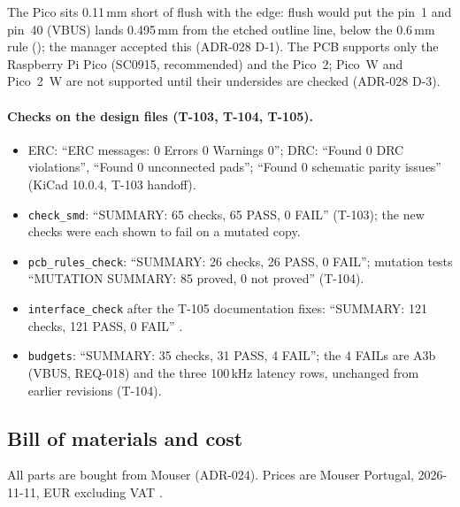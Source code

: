 The Pico sits 0.11\,mm short of flush with the edge: flush would put the pin~1 and
pin~40 (VBUS) lands 0.495\,mm from the etched outline line, below the 0.6\,mm rule
(); the manager accepted this (ADR-028 D-1). The PCB supports
only the Raspberry Pi Pico (SC0915, recommended) and the Pico~2; Pico~W and Pico~2~W
are not supported until their undersides are checked (ADR-028 D-3).

\paragraph{Checks on the design files (T-103, T-104, T-105).}
\begin{itemize}[noitemsep]
  \item ERC: ``ERC messages: 0  Errors 0  Warnings 0''; DRC: ``Found 0 DRC
        violations'', ``Found 0 unconnected pads''; ``Found 0 schematic parity
        issues'' (KiCad 10.0.4, T-103 handoff).
  \item \nolinkurl{check_smd}: ``SUMMARY: 65 checks, 65 PASS, 0 FAIL'' (T-103); the
        new checks were each shown to fail on a mutated copy.
  \item \nolinkurl{pcb_rules_check}: ``SUMMARY: 26 checks, 26 PASS, 0 FAIL''; mutation
        tests ``MUTATION SUMMARY: 85 proved, 0 not proved'' (T-104).
  \item \nolinkurl{interface_check} after the T-105 documentation fixes:
        ``SUMMARY: 121 checks, 121 PASS, 0 FAIL''
        .
  \item \nolinkurl{budgets}: ``SUMMARY: 35 checks, 31 PASS, 4 FAIL''; the 4 FAILs are
        A3b (VBUS, REQ-018) and the three 100\,kHz latency rows, unchanged from
        earlier revisions (T-104).
\end{itemize}

\subsection{Bill of materials and cost}
\label{sec:v13-bom}

All parts are bought from Mouser (ADR-024). Prices are  Mouser Portugal,
2026-11-11, EUR excluding VAT .

